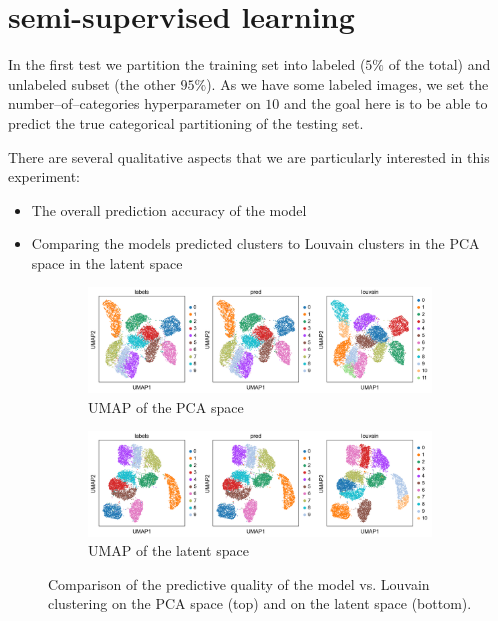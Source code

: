 \documentclass[11pt, a4paper]{report}
\theoremstyle{plain}
\theoremstyle{definition}
\theoremstyle{remark}
\begin{document}
\section{semi-supervised learning}

In the first test we partition the training set into labeled
($5\%$ of the total) and unlabeled subset (the other $95\%$).
As we have some labeled images, we set the number--of--categories hyperparameter
on $10$ and the goal here is to be able to predict the true categorical
partitioning of the testing set.

There are several qualitative aspects that we are particularly interested in
this experiment:

\begin{itemize}
\item{} The overall prediction accuracy of the model
\item{} Comparing the models predicted clusters to Louvain clusters
\subitem{} in the PCA space
\subitem{} in the latent space
\end{itemize}


\begin{figure}[h]
\centering
\begin{subfigure}[b]{0.95\textwidth}
\includegraphics[width=\textwidth]{images/gmmvae_mnist_ss_pca_umap.png}
\caption{UMAP of the PCA space}
\label{fig:mnist_ss_pca}
\end{subfigure}
\begin{subfigure}[b]{0.95\textwidth}
\includegraphics[width=\textwidth]{images/gmmvae_mnist_ss_latent_umap.png}
\caption{UMAP of the latent space}
\label{fig:mnist_ss_latent}
\end{subfigure}
\caption{Comparison of the predictive quality of the model vs. Louvain
clustering on the PCA space (top) and on the latent space (bottom).}
\label{fig:mnist_ss_umaps}
\end{figure}
\end{document}
